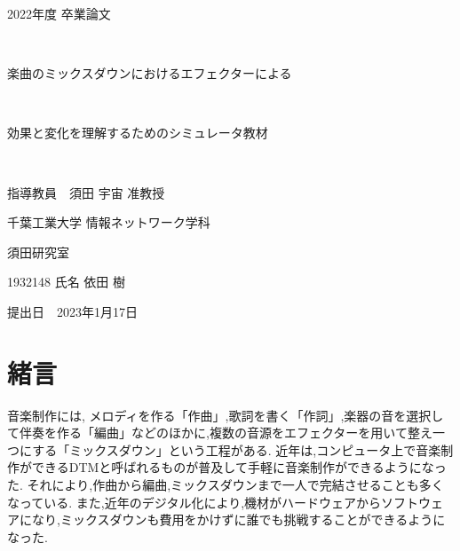 \documentclass[12pt,a4j,titlepage]{ltjsarticle}
\begin{document}
\begin{titlepage}
  \begin{center}
  
    \vspace*{20truept}
    
    {\LARGE 2022年度 卒業論文} 
    
    \vspace*{75truept}
    
    {\Huge }　%
    
    \vspace{10truept}
    {\LARGE 楽曲のミックスダウンにおけるエフェクターによる}

    {\Huge }　%

    {\LARGE 効果と変化を理解するためのシミュレータ教材}
    \vspace{10truept}

    {\Huge }　%
    
    \vspace{85truept}
    
    {\LARGE 指導教員　須田 宇宙 准教授}
    
    \vspace{60truept}
    
    {\LARGE 千葉工業大学 情報ネットワーク学科}
    
    \vspace{15truept}
    
    {\LARGE 須田研究室}
    
    \vspace{70truept}
    
    {\LARGE 1932148 氏名 依田 樹 }　%

    \vspace{70truept}
    
  \end{center}
  \begin{flushright}

    {\LARGE 提出日　2023年1月17日}
  
  \end{flushright}
\end{titlepage}

\setcounter{tocdepth}{3}
\tableofcontents
\newpage
\listoftables
\listoffigures
\clearpage
{}
\setcounter{page}{1}
\section{緒言}
音楽制作には, メロディを作る「作曲」,歌詞を書く「作詞」,楽器の音を選択して伴奏を作る「編曲」などのほかに,複数の音源をエフェクターを用いて整え一つにする「ミックスダウン」という工程がある\cite{mix}.
近年は,コンピュータ上で音楽制作ができるDTMと呼ばれるものが普及して手軽に音楽制作ができるようになった.
それにより,作曲から編曲,ミックスダウンまで一人で完結させることも多くなっている.
また,近年のデジタル化により,機材がハードウェアからソフトウェアになり,ミックスダウンも費用をかけずに誰でも挑戦することができるようになった\cite{digital}.
\end{document}
